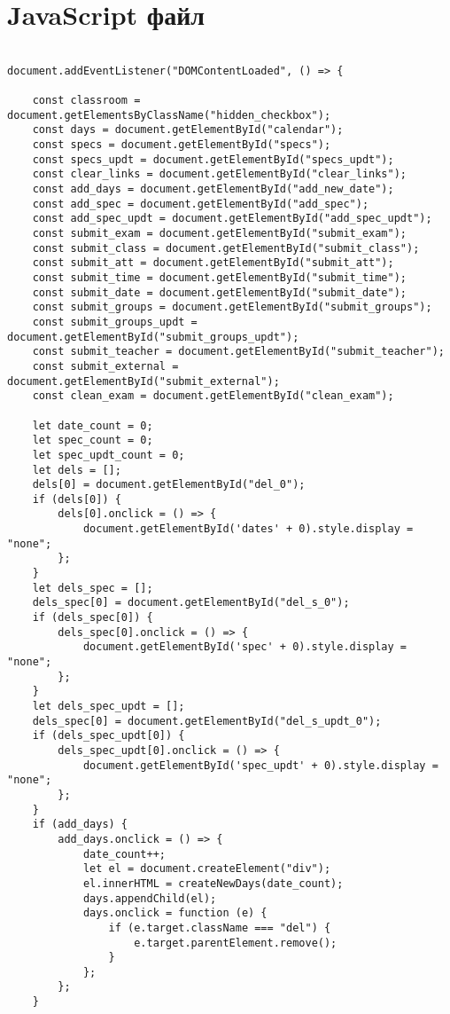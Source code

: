 \chapter{JavaScript файл}\label{appendix-js}	

\begin{lstlisting}
	
document.addEventListener("DOMContentLoaded", () => {
	
	const classroom = document.getElementsByClassName("hidden_checkbox");
	const days = document.getElementById("calendar");
	const specs = document.getElementById("specs");
	const specs_updt = document.getElementById("specs_updt");
	const clear_links = document.getElementById("clear_links");
	const add_days = document.getElementById("add_new_date");
	const add_spec = document.getElementById("add_spec");
	const add_spec_updt = document.getElementById("add_spec_updt");
	const submit_exam = document.getElementById("submit_exam");
	const submit_class = document.getElementById("submit_class");
	const submit_att = document.getElementById("submit_att");
	const submit_time = document.getElementById("submit_time");
	const submit_date = document.getElementById("submit_date");
	const submit_groups = document.getElementById("submit_groups");
	const submit_groups_updt = document.getElementById("submit_groups_updt");
	const submit_teacher = document.getElementById("submit_teacher");
	const submit_external = document.getElementById("submit_external");
	const clean_exam = document.getElementById("clean_exam");
	
	let date_count = 0;
	let spec_count = 0;
	let spec_updt_count = 0;
	let dels = [];
	dels[0] = document.getElementById("del_0");
	if (dels[0]) {
		dels[0].onclick = () => {
			document.getElementById('dates' + 0).style.display = "none";
		};
	}
	let dels_spec = [];
	dels_spec[0] = document.getElementById("del_s_0");
	if (dels_spec[0]) {
		dels_spec[0].onclick = () => {
			document.getElementById('spec' + 0).style.display = "none";
		};
	}
	let dels_spec_updt = [];
	dels_spec[0] = document.getElementById("del_s_updt_0");
	if (dels_spec_updt[0]) {
		dels_spec_updt[0].onclick = () => {
			document.getElementById('spec_updt' + 0).style.display = "none";
		};
	}
	if (add_days) {
		add_days.onclick = () => {
			date_count++;
			let el = document.createElement("div");
			el.innerHTML = createNewDays(date_count);
			days.appendChild(el);
			days.onclick = function (e) {
				if (e.target.className === "del") {
					e.target.parentElement.remove();
				}
			};
		};
	}
	

\end{lstlisting}
